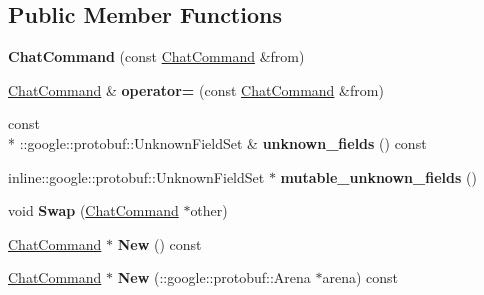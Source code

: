\subsection*{Public Member Functions}
\begin{DoxyCompactItemize}
\item 
\hypertarget{classSimpleChat_1_1ChatCommand_aa16520371fefabad5f42be66c2166115}{{\bfseries Chat\-Command} (const \hyperlink{classSimpleChat_1_1ChatCommand}{Chat\-Command} \&from)}\label{classSimpleChat_1_1ChatCommand_aa16520371fefabad5f42be66c2166115}

\item 
\hypertarget{classSimpleChat_1_1ChatCommand_a7c066b1b1e8df8fa4cbdcada306b5131}{\hyperlink{classSimpleChat_1_1ChatCommand}{Chat\-Command} \& {\bfseries operator=} (const \hyperlink{classSimpleChat_1_1ChatCommand}{Chat\-Command} \&from)}\label{classSimpleChat_1_1ChatCommand_a7c066b1b1e8df8fa4cbdcada306b5131}

\item 
\hypertarget{classSimpleChat_1_1ChatCommand_afc3fdc2a7378b379d0b1b5bd96c15b84}{const \\*
\-::google\-::protobuf\-::\-Unknown\-Field\-Set \& {\bfseries unknown\-\_\-fields} () const }\label{classSimpleChat_1_1ChatCommand_afc3fdc2a7378b379d0b1b5bd96c15b84}

\item 
\hypertarget{classSimpleChat_1_1ChatCommand_aab03f63fc0707e0f99354f22ba7d24a9}{inline\-::google\-::protobuf\-::\-Unknown\-Field\-Set $\ast$ {\bfseries mutable\-\_\-unknown\-\_\-fields} ()}\label{classSimpleChat_1_1ChatCommand_aab03f63fc0707e0f99354f22ba7d24a9}

\item 
\hypertarget{classSimpleChat_1_1ChatCommand_a089731c3f481fc59720de75bb57d0453}{void {\bfseries Swap} (\hyperlink{classSimpleChat_1_1ChatCommand}{Chat\-Command} $\ast$other)}\label{classSimpleChat_1_1ChatCommand_a089731c3f481fc59720de75bb57d0453}

\item 
\hypertarget{classSimpleChat_1_1ChatCommand_abd47580fa1ed63285ff861c67bac13d7}{\hyperlink{classSimpleChat_1_1ChatCommand}{Chat\-Command} $\ast$ {\bfseries New} () const }\label{classSimpleChat_1_1ChatCommand_abd47580fa1ed63285ff861c67bac13d7}

\item 
\hypertarget{classSimpleChat_1_1ChatCommand_a4a1aaeaf97d2027fcb439262a6fa2641}{\hyperlink{classSimpleChat_1_1ChatCommand}{Chat\-Command} $\ast$ {\bfseries New} (\-::google\-::protobuf\-::\-Arena $\ast$arena) const }\label{classSimpleChat_1_1ChatCommand_a4a1aaeaf97d2027fcb439262a6fa2641}


\end{DoxyCompactItemize}
